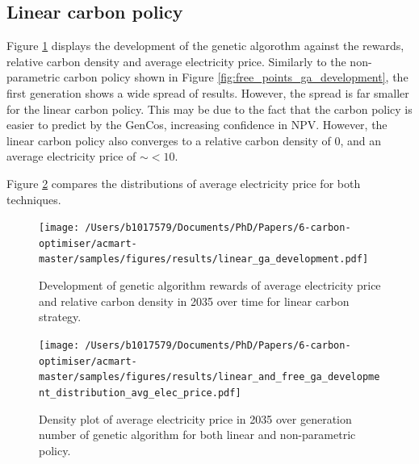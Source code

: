\documentclass[sigconf]{acmart}
\begin{document}
\subsection{Linear carbon policy}
\label{sssec:result_linear_carbon_strategy}

Figure \ref{fig:linear_ga_development} displays the development of the genetic algorothm against the rewards, relative carbon density and average electricity price. Similarly to the non-parametric carbon policy shown in Figure \ref{fig:free_points_ga_development}, the first generation shows a wide spread of results. However, the spread is far smaller for the linear carbon policy. This may be due to the fact that the carbon policy is easier to predict by the GenCos, increasing confidence in NPV. However, the linear carbon policy also converges to a relative carbon density of 0, and an average electricity price of ${\sim}<10$.

Figure \ref{fig:comparison_of_distributions} compares the distributions of average electricity price for both techniques.

\begin{figure}
\centering
\texttt{[image: /Users/b1017579/Documents/PhD/Papers/6-carbon-optimiser/acmart-master/samples/figures/results/linear\_ga\_development.pdf]}
\caption{Development of genetic algorithm rewards of average electricity price and relative carbon density in 2035 over time for linear carbon strategy.}
\label{fig:linear_ga_development}
\end{figure}





\begin{figure}
\centering
\texttt{[image: /Users/b1017579/Documents/PhD/Papers/6-carbon-optimiser/acmart-master/samples/figures/results/linear\_and\_free\_ga\_development\_distribution\_avg\_elec\_price.pdf]}
\caption{Density plot of average electricity price in 2035 over generation number of genetic algorithm for both linear and non-parametric policy.}
\label{fig:comparison_of_distributions}
\end{figure}
\end{document}
